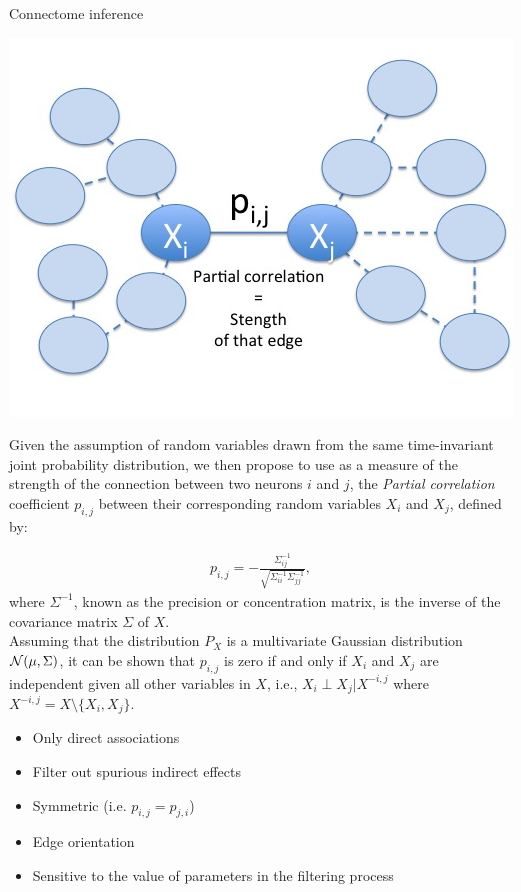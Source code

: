 \documentclass[final]{beamer}
\newcommand{\cmark}{\ding{51}}%
\newcommand{\xmark}{\ding{55}}%
\begin{document}
\begin{frame}{}
\begin{textblock}{0.485}
\begin{block}{Connectome inference \phantom{p}}

\includegraphics[width=\linewidth]{images/partial2.png}

Given the assumption of random variables drawn from the same time-invariant joint probability distribution, we then propose to use as a measure of the
strength of the connection between two neurons $i$ and $j$, the
\textit{Partial correlation} coefficient $p_{i,j}$ between their corresponding
random variables $X_i$ and $X_j$, defined by:

\begin{align*}
p_{i,j} =
-\frac{\Sigma^{-1}_{ij}}{\sqrt{\Sigma^{-1}_{ii} \Sigma^{-1}_{jj}}}, \label{eq:inverse}
\end{align*}
where $\Sigma^{-1}$, known as the precision or concentration matrix, is the inverse of the covariance matrix $\Sigma$ of $X$.\\ 

Assuming that the distribution $P_X$ is a multivariate Gaussian
distribution ${\cal N}(\mu,\Sigma)$, it can be shown that $p_{i,j}$ is
zero if and only if $X_i$ and $X_j$ are independent given all other
variables in $X$, i.e., $X_i \perp X_j|X^{-i,j}$ where $X^{-i,j}= X
\setminus\{X_i,X_j\}$.

\begin{itemize}
\item[{\color{green} \cmark}] Only direct associations
\item[{\color{green} \cmark}] Filter out spurious indirect effects
\item[{\color{green} \cmark}] Symmetric (i.e. $p_{i,j}=p_{j,i}$)\\[5ex]
\item[{\color{red} \xmark}] Edge orientation
\item[{\color{red} \xmark}] Sensitive to the value of parameters in the filtering process
\end{itemize}


\end{block}
\end{textblock}
\end{frame}
\end{document}
